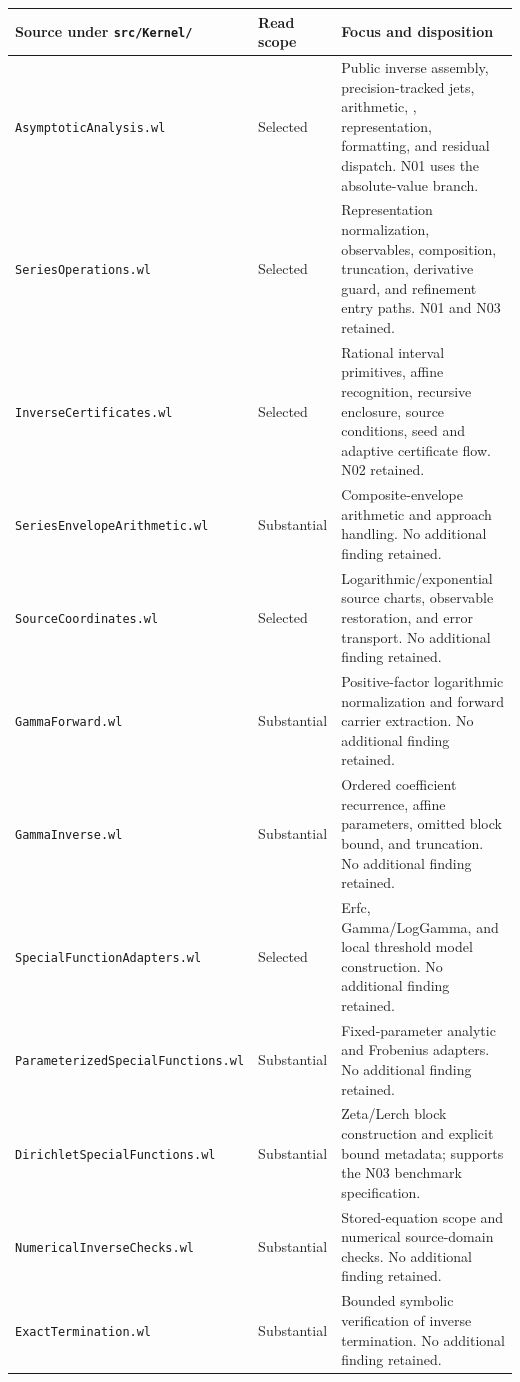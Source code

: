 \documentclass[11pt,a4paper]{article}
\newcommand{\code}[1]{\texttt{\detokenize{#1}}}
\newcommand{\file}[1]{\nolinkurl{#1}}
\begin{document}
\begin{longtable}{@{}L{65mm}L{20mm}L{\dimexpr\textwidth-85mm-4\tabcolsep\relax}@{}}
\toprule Source under \file{src/Kernel/} & Read scope & Focus and disposition\\\midrule\endhead
\file{AsymptoticAnalysis.wl} & Selected & Public inverse assembly, precision-tracked jets, arithmetic, \code{fwdAbs}, representation, formatting, and residual dispatch. N01 uses the absolute-value branch.\\
\file{SeriesOperations.wl} & Selected & Representation normalization, observables, composition, truncation, derivative guard, and refinement entry paths. N01 and N03 retained.\\
\file{InverseCertificates.wl} & Selected & Rational interval primitives, affine recognition, recursive enclosure, source conditions, seed and adaptive certificate flow. N02 retained.\\
\file{SeriesEnvelopeArithmetic.wl} & Substantial & Composite-envelope arithmetic and approach handling. No additional finding retained.\\
\file{SourceCoordinates.wl} & Selected & Logarithmic/exponential source charts, observable restoration, and error transport. No additional finding retained.\\
\file{GammaForward.wl} & Substantial & Positive-factor logarithmic normalization and forward carrier extraction. No additional finding retained.\\
\file{GammaInverse.wl} & Substantial & Ordered coefficient recurrence, affine parameters, omitted block bound, and truncation. No additional finding retained.\\
\file{SpecialFunctionAdapters.wl} & Selected & Erfc, Gamma/LogGamma, and local threshold model construction. No additional finding retained.\\
\file{ParameterizedSpecialFunctions.wl} & Substantial & Fixed-parameter analytic and Frobenius adapters. No additional finding retained.\\
\file{DirichletSpecialFunctions.wl} & Substantial & Zeta/Lerch block construction and explicit bound metadata; supports the N03 benchmark specification.\\
\file{NumericalInverseChecks.wl} & Substantial & Stored-equation scope and numerical source-domain checks. No additional finding retained.\\
\file{ExactTermination.wl} & Substantial & Bounded symbolic verification of inverse termination. No additional finding retained.\\

\end{longtable}
\end{document}
